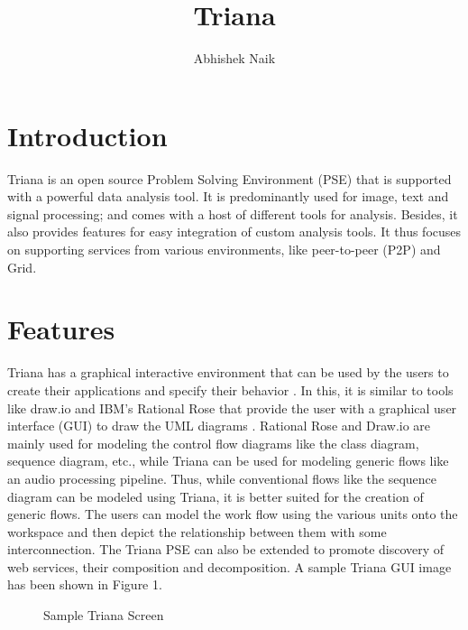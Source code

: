 \documentclass[9pt,twocolumn,twoside]{../../styles/osajnl}
\title{Triana}
\author{Abhishek Naik}
\affil[1]{School of Informatics and Computing, Bloomington, IN 47408, U.S.A.}
\affil[*]{Corresponding authors: ahnaik@indiana.edu}
\begin{document}
\maketitle

\section{Introduction}

Triana is an open source Problem Solving Environment (PSE) that is
supported with a powerful data analysis tool.  It is predominantly
used for image, text and signal processing; and comes with a host of
different tools for analysis.  Besides, it also provides features for
easy integration of custom analysis tools.  It thus focuses on
supporting services from various environments, like peer-to-peer (P2P)
and Grid.

\section{Features}
Triana has a graphical interactive environment that can be used by the
users to create their applications and specify their behavior
\cite{TrianaDocumentation1}.  In this, it is similar to tools like
draw.io and IBM's Rational Rose that provide the user with a graphical
user interface (GUI) to draw the UML diagrams \cite{DrawIO}
\cite{IBM-Rational-Rose}.  Rational Rose and Draw.io are mainly used
for modeling the control flow diagrams like the class diagram,
sequence diagram, etc., while Triana can be used for modeling generic
flows like an audio processing pipeline.  Thus, while conventional
flows like the sequence diagram can be modeled using Triana, it is
better suited for the creation of generic flows.  The users can model
the work flow using the various units onto the workspace and then
depict the relationship between them with some interconnection.  The
Triana PSE can also be extended to promote discovery of web services,
their composition and decomposition.  A sample Triana GUI image has
been shown in Figure 1.

\begin{figure}[htbp]
  \centering
  \caption{Sample Triana Screen \cite{TrianaDocumentation2}}
\end{figure}
\end{document}
